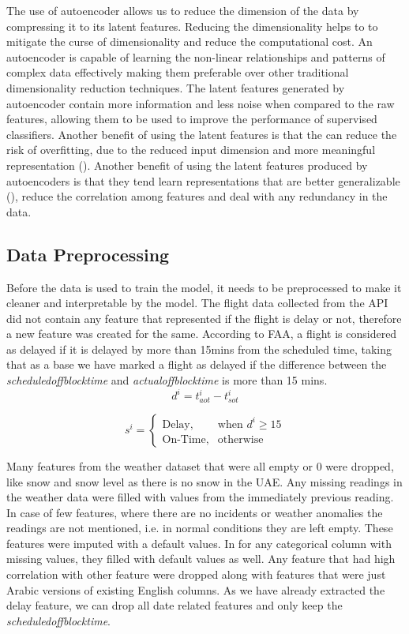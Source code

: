 \documentclass[twoside,11pt]{article}
\begin{document}
The use of autoencoder allows us to reduce the dimension of the data by compressing it to its latent features. Reducing the dimensionality helps to to mitigate the curse of dimensionality and reduce the computational cost. An autoencoder is capable of learning the non-linear relationships and patterns of complex data effectively making them preferable over other traditional dimensionality reduction techniques. The latent features generated by autoencoder contain more information and less noise when compared to the raw features, allowing them to be used to improve the performance of supervised classifiers. Another benefit of using the latent features is that the can reduce the risk of overfitting, due to the reduced input dimension and more meaningful representation (\citealp{berahmandAutoencodersTheirApplications2024}). Another benefit of using the latent features produced by autoencoders is that they tend learn representations that are better generalizable (\citealp{gabdullinLatentSpaceConfiguration2024}), reduce the correlation among features and deal with any redundancy in the data.

\subsection{Data Preprocessing}
Before the data is used to train the model, it needs to be preprocessed to make it cleaner and interpretable by the model. The flight data collected from the API did not contain any feature that represented if the flight is delay or not, therefore a new feature was created for the same. According to FAA, a flight is considered as delayed if it is delayed by more than 15mins from the scheduled time, taking that as a base we have marked a flight as delayed if the difference between the \emph{scheduledoffblocktime} and \emph{actualoffblocktime} is more than 15 mins.
\[
  d^i = t_{aot}^i - t_{sot}^i
  \]

\[
  s^i = \begin{cases}
      \text{Delay}, & \text{when } d^i\geq 15\\
      \text{On-Time}, & \text{otherwise }
      \end{cases}
\]

Many features from the weather dataset that were all empty or 0 were dropped, like snow and snow level as there is no snow in the UAE. Any missing readings in the weather data were filled with values from the immediately previous reading. In case of few features, where there are no incidents or weather anomalies the readings are not mentioned, i.e. in normal conditions they are left empty. These features were imputed with a default values. In for any categorical column with missing values, they filled with default values as well. Any feature that had high correlation with other feature were dropped along with features that were just Arabic versions of existing English columns. As we have already extracted the delay feature, we can drop all date related features and only keep the \emph{scheduledoffblocktime}. 
\end{document}
